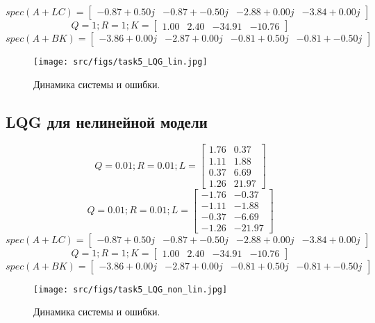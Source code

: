        \[spec(A+LC) = \begin{bmatrix}
        -0.87 + 0.50j & -0.87 + -0.50j & -2.88 + 0.00j & -3.84 + 0.00j
       \end{bmatrix}\]
       \[Q = 1; R = 1; K= \begin{bmatrix}
         1.00 &  2.40 & -34.91 & -10.76
       \end{bmatrix}\]
       \[spec(A + BK) = \begin{bmatrix}
        -3.86 + 0.00j & -2.87 + 0.00j & -0.81 + 0.50j & -0.81 + -0.50j
       \end{bmatrix}\]
\begin{figure}[ht!]
        \centering
        \texttt{[image: src/figs/task5\_LQG\_lin.jpg]}
        \caption{Динамика системы и ошибки.}
        \label{fig:task5_4}
\end{figure}
\FloatBarrier

\subsection{ LQG для нелинейной модели}
\[Q = 0.01; R = 0.01; L = \begin{bmatrix}
        1.76 &  0.37\\
        1.11 &  1.88\\
        0.37 &  6.69\\
        1.26 &  21.97
      \end{bmatrix}\]
      \[Q = 0.01; R = 0.01; L = \begin{bmatrix}
       -1.76 & -0.37\\
       -1.11 & -1.88\\
       -0.37 & -6.69\\
       -1.26 & -21.97
      \end{bmatrix}\]
      \[spec(A+LC) = \begin{bmatrix}
       -0.87 + 0.50j & -0.87 + -0.50j & -2.88 + 0.00j & -3.84 + 0.00j
      \end{bmatrix}\]
      \[Q = 1; R = 1; K= \begin{bmatrix}
        1.00 &  2.40 & -34.91 & -10.76
      \end{bmatrix}\]
      \[spec(A + BK) = \begin{bmatrix}
       -3.86 + 0.00j & -2.87 + 0.00j & -0.81 + 0.50j & -0.81 + -0.50j
      \end{bmatrix}\]
\begin{figure}[ht!]
        \centering
        \texttt{[image: src/figs/task5\_LQG\_non\_lin.jpg]}
        \caption{Динамика системы и ошибки.}
        \label{fig:task5_5}
\end{figure}
\FloatBarrier